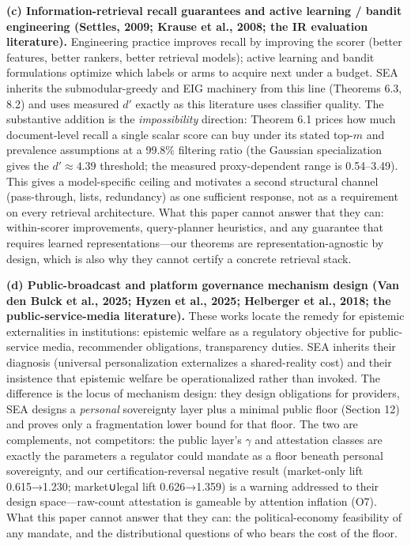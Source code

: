 \documentclass[
  11pt]{article}
\begin{document}
\textbf{(c) Information-retrieval recall guarantees and active learning
/ bandit engineering (Settles, 2009; Krause et al., 2008; the IR
evaluation literature).} Engineering practice improves recall by
improving the scorer (better features, better rankers, better retrieval
models); active learning and bandit formulations optimize which labels
or arms to acquire next under a budget. SEA inherits the
submodular-greedy and EIG machinery from this line (Theorems 6.3, 8.2)
and uses measured \(d'\) exactly as this literature uses classifier
quality. The substantive addition is the \emph{impossibility} direction:
Theorem 6.1 prices how much document-level recall a single scalar score
can buy under its stated top-\(m\) and prevalence assumptions at a
99.8\% filtering ratio (the Gaussian specialization gives the
\(d'\approx4.39\) threshold; the measured proxy-dependent range is
0.54--3.49). This gives a model-specific ceiling and motivates a second
structural channel (pass-through, lists, redundancy) as one sufficient
response, not as a requirement on every retrieval architecture. What
this paper cannot answer that they can: within-scorer improvements,
query-planner heuristics, and any guarantee that requires learned
representations---our theorems are representation-agnostic by design,
which is also why they cannot certify a concrete retrieval stack.

\textbf{(d) Public-broadcast and platform governance mechanism design
(Van den Bulck et al., 2025; Hyzen et al., 2025; Helberger et al., 2018;
the public-service-media literature).} These works locate the remedy for
epistemic externalities in institutions: epistemic welfare as a
regulatory objective for public-service media, recommender obligations,
transparency duties. SEA inherits their diagnosis (universal
personalization externalizes a shared-reality cost) and their insistence
that epistemic welfare be operationalized rather than invoked. The
difference is the locus of mechanism design: they design obligations for
providers, SEA designs a \emph{personal} sovereignty layer plus a
minimal public floor (Section 12) and proves only a fragmentation lower
bound for that floor. The two are complements, not competitors: the
public layer's \(\gamma\) and attestation classes are exactly the
parameters a regulator could mandate as a floor beneath personal
sovereignty, and our certification-reversal negative result (market-only
lift 0.615→1.230; market∪legal lift 0.626→1.359) is a warning addressed
to their design space---raw-count attestation is gameable by attention
inflation (O7). What this paper cannot answer that they can: the
political-economy feasibility of any mandate, and the distributional
questions of who bears the cost of the floor.
\end{document}
